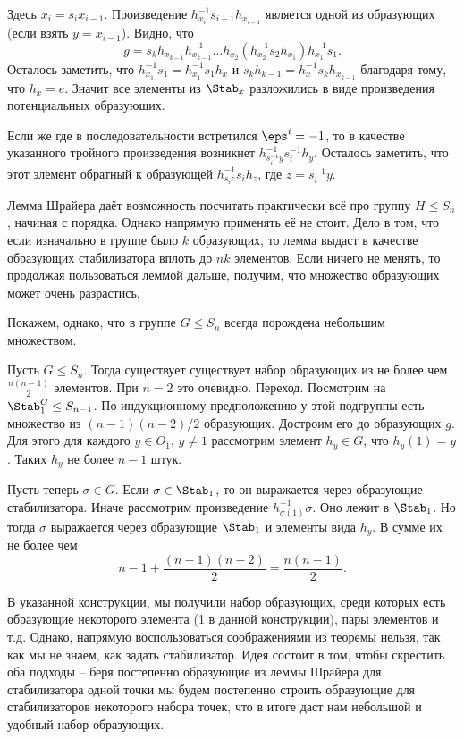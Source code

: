 Здесь $x_i=s_i x_{i-1}$. Произведение $h_{x_i}^{-1}s_{i-1}h_{x_{i-1}}$ является одной из образующих (если взять $y=x_{i-1}$). Видно, что $$g=s_kh_{x_{k-1}}h_{x_{k-1}}^{-1}\dots h_{x_2} (h_{x_2}^{-1}s_2 h_{x_1})h_{x_1}^{-1}s_1.$$
Осталось заметить, что $h_{x_1}^{-1}s_1=h_{x_1}^{-1}s_1h_x$ и $s_k h_{k-1}=h_x^{-1}s_k h_{x_{k-1}}$ благодаря тому, что $h_x=e$. Значит все элементы из $\Stab_x$ разложились в виде произведения потенциальных образующих. 

Если же где в последовательности встретился $\eps^{i}=-1$, то в качестве указанного тройного произведения возникнет $h^{-1}_{s_i^{-1}y} s_i^{-1} h_y$. Осталось заметить, что этот элемент обратный к образующей $h^{-1}_{s_iz}s_i h_z$, где $z=s_i^{-1}y$.

\endproof



Лемма Шрайера даёт возможность посчитать практически всё про группу $H \leq S_n$, начиная с порядка. Однако напрямую применять её не стоит. Дело в том, что если изначально в группе было $k$ образующих, то лемма выдаст в качестве образующих стабилизатора вплоть до $nk$ элементов. Если ничего не менять, то продолжая пользоваться леммой дальше,  получим, что множество образующих может очень разрастись. 

Покажем, однако, что в группе $G\leq S_n$ всегда порождена небольшим множеством.


\thrm Пусть $G\leq S_n$. Тогда существует существует набор образующих из не более чем $\frac{n(n-1)}{2}$ элементов.
\proof  При $n=2$ это очевидно. Переход. Посмотрим на $\Stab_{1}^G \leq S_{n-1}$. По индукционному предположению у этой подгруппы есть множество из $(n-1)(n-2)/2$ образующих. Достроим его до образующих $g$. Для этого для каждого $y\in O_{1},\, y\neq 1$ рассмотрим элемент $h_y\in G$, что $h_y(1)=y$. Таких $h_y$ не более $n-1$ штук.

Пусть теперь $\sigma \in G$. Если $\sigma \in \Stab_{1}$, то он выражается через образующие стабилизатора. Иначе рассмотрим произведение $h_{\sigma(1)}^{-1}\sigma$. Оно лежит в $\Stab_{1}$. Но тогда $\sigma$ выражается через образующие $\Stab_{1}$ и элементы вида $h_y$. В сумме их не более чем 
$$n-1+\frac{(n-1)(n-2)}{2}=\frac{n(n-1)}{2}.$$
\endproof
\ethrm

В указанной конструкции, мы получили набор образующих, среди которых есть образующие некоторого элемента (1 в данной конструкции), пары элементов и т.д. Однако, напрямую воспользоваться соображениями из теоремы нельзя, так как мы не знаем, как задать стабилизатор. Идея состоит в том, чтобы скрестить оба подходы -- беря постепенно образующие из леммы Шрайера для стабилизатора одной точки мы будем постепенно строить образующие для стабилизаторов некоторого набора точек, что  в итоге даст нам небольшой и удобный набор образующих.


